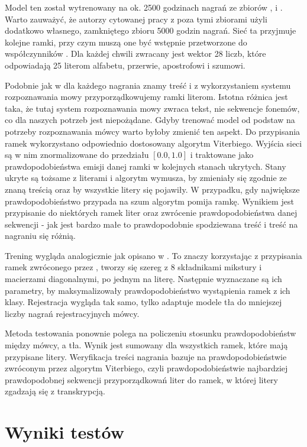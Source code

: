 Model ten został wytrenowany na ok. 2500 godzinach nagrań ze zbiorów , 
i . Warto zauważyć, że autorzy cytowanej pracy z  poza tymi zbiorami użyli
dodatkowo własnego, zamkniętego zbioru 5000 godzin nagrań. Sieć ta przyjmuje kolejne ramki, przy czym muszą
one być wstępnie przetworzone do współczynników . Dla każdej chwili zwracany jest wektor 28 liczb,
które odpowiadają 25 literom alfabetu, przerwie, apostrofowi i szumowi.

Podobnie jak w  dla każdego nagrania znamy treść i z wykorzystaniem systemu rozpoznawania
mowy przyporządkowujemy ramki literom. Istotna różnica jest taka, że tutaj system rozpoznawania mowy zwraca
tekst, nie sekwencje fonemów, co dla naszych potrzeb jest niepożądane. Gdyby trenować model od podstaw na
potrzeby rozpoznawania mówcy warto byłoby zmienić ten aspekt. Do przypisania ramek wykorzystano odpowiednio
dostosowany algorytm Viterbiego. Wyjścia sieci są w nim znormalizowane do przedziału $[0.0, 1.0]$ i traktowane
jako prawdopodobieństwa emisji danej ramki w kolejnych stanach ukrytych. Stany ukryte są tożsame z literami
i algorytm wymusza, by zmieniały się zgodnie ze znaną treścią oraz by wszystkie litery się pojawiły.
W przypadku, gdy największe prawdopodobieństwo przypada na szum algorytm pomija ramkę. Wynikiem
jest przypisanie do niektórych ramek liter oraz zwrócenie prawdopodobieństwa danej sekwencji - jak jest
bardzo małe to prawdopodobnie spodziewana treść i treść na nagraniu się różnią.

Trening wygląda analogicznie jak opisano w . To znaczy korzystając z przypisania ramek
zwróconego przez , tworzy się szereg  z $8$ składnikami mikstury
i macierzami diagonalnymi, po jednym na literę. Następnie wyznaczane są ich parametry, by
maksymalizowały prawdopodobieństwo wystąpienia
ramek z ich klasy. Rejestracja wygląda tak samo, tylko  adaptuje modele tła do
mniejszej liczby nagrań rejestracyjnych mówcy.

Metoda testowania ponownie polega na policzeniu stosunku prawdopodobieństw między  mówcy, a tła.
Wynik jest sumowany dla wszystkich ramek, które mają przypisane litery. Weryfikacja treści nagrania
bazuje na prawdopodobieństwie zwróconym przez algorytm Viterbiego, czyli prawdopodobieństwie najbardziej
prawdopodobnej sekwencji przyporządkowań liter do ramek, w której litery zgadzają się z transkrypcją.

\section{Wyniki testów}
\label{sec:test_results}

